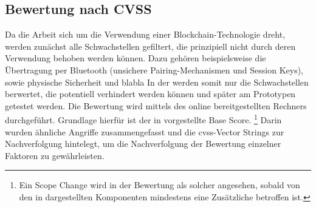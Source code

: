 \subsection{Bewertung nach CVSS}
\label{sec:analysis_cvss}
    Da die Arbeit sich um die Verwendung einer Blockchain-Technologie dreht, werden zunächst alle Schwachstellen gefiltert, die prinzipiell nicht durch deren Verwendung behoben werden können.
    Dazu gehören beispielsweise die Übertragung per Bluetooth (unsichere Pairing-Mechanismen und Session Keys), sowie physische Sicherheit und blabla
    In der  werden somit nur die Schwachstellen berwertet, die potentiell verhindert werden können und später am Prototypen getestet werden.
    Die Bewertung wird mittels des online bereitgestellten Rechners\cite{CvssCalc} durchgeführt.
	Grundlage hierfür ist der in  vorgestellte Base Score.
	\footnote{Ein Scope Change wird in der Bewertung als solcher angesehen, sobald von den in  dargestellten Komponenten mindestens eine Zusätzliche betroffen ist.}
	Darin wurden ähnliche Angriffe zusammengefasst und die \gls{cvss}-Vector Strings zur Nachverfolgung hintelegt, um die Nachverfolgung der Bewertung einzelner Faktoren zu gewährleisten.
	
